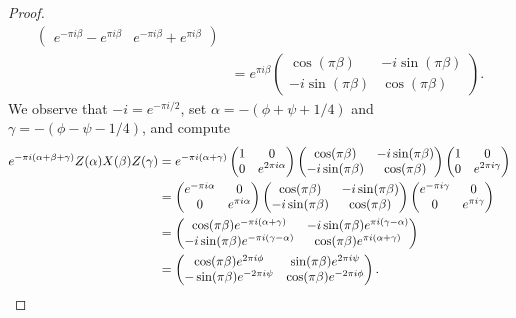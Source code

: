 \documentclass[a4paper, oneside, 12pt]{amsart}
\begin{document}
\begin{proof}
\begin{align*}
\begin{pmatrix}
      e^{- \pi i \beta} - e^{\pi i \beta} & e^{-\pi i \beta} + e^{\pi i \beta}
    \end{pmatrix} \\
    & =
    e^{\pi i \beta}
    \begin{pmatrix}
      \cos( \pi \beta) & -i \sin (\pi \beta) \\
      -i \sin ( \pi \beta) & \cos(\pi \beta)
    \end{pmatrix}.
  \end{align*}
  We  observe that \( -i = e^{-\pi i / 2} \), set \( \alpha = -(\phi + \psi + 1/4) \) and \( \gamma = -(\phi - \psi - 1/4) \), and compute
  \begin{align*}
    e^{-\pi i(\alpha + \beta + \gamma)} Z(\alpha) X(\beta) Z(\gamma)
    & =
      e^{-\pi i(\alpha + \gamma)}
    \begin{pmatrix}
      1 & 0 \\
      0 & e^{2\pi i \alpha}
    \end{pmatrix}
    \begin{pmatrix}
      \cos( \pi \beta) & -i \sin (\pi \beta) \\
      -i \sin ( \pi \beta) & \cos(\pi \beta)
    \end{pmatrix}
    \begin{pmatrix}
      1 & 0 \\
      0 & e^{2\pi i \gamma}
    \end{pmatrix}\\
    & =
    \begin{pmatrix}
      e^{-\pi i \alpha} & 0 \\
      0 & e^{\pi i \alpha}
    \end{pmatrix}
    \begin{pmatrix}
      \cos( \pi \beta) & -i \sin (\pi \beta) \\
      -i \sin ( \pi \beta) & \cos(\pi \beta)
    \end{pmatrix}
    \begin{pmatrix}
      e^{-\pi i \gamma} & 0 \\
      0 & e^{\pi i \gamma}
    \end{pmatrix} \\
    & =
    \begin{pmatrix}
      \cos(\pi \beta) e^{-\pi i(\alpha+\gamma)} & -i \sin(\pi \beta) e^{\pi i(\gamma- \alpha)} \\
      -i \sin(\pi \beta) e^{-\pi i(\gamma - \alpha)} & \cos(\pi \beta) e^{\pi i(\alpha+\gamma)}
    \end{pmatrix}
    \\
    & =
      \begin{pmatrix}
      \cos(\pi \beta) e^{2\pi i \phi} & \sin(\pi \beta) e^{2\pi i \psi} \\
      -\sin(\pi \beta) e^{-2\pi i \psi} & \cos(\pi \beta) e^{-2\pi i \phi}
    \end{pmatrix}. \qedhere
  \end{align*}
\end{proof}
\end{document}
